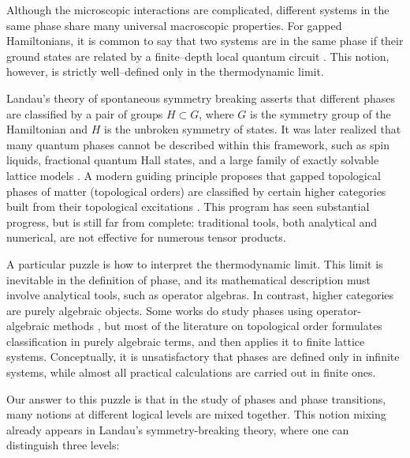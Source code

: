 \documentclass[reprint, amsmath, amssymb, showpacs, floatfix, longbibliography, aps, twocolumn, superscriptaddress, nofootinbib]{revtex4-2}
\theoremstyle{definition}
\begin{document}
Although the microscopic interactions are complicated, different systems in the same phase share many universal macroscopic properties. For gapped Hamiltonians, it is common to say that two systems are in the same phase if their ground states are related by a finite–depth local quantum circuit \cite{zeng-2019}. This notion, however, is strictly well–defined only in the thermodynamic limit.

Landau’s theory of spontaneous symmetry breaking asserts that different phases are classified by a pair of groups $H\subset G$, where $G$ is the symmetry group of the Hamiltonian and $H$ is the unbroken symmetry of states. It was later realized that many quantum phases cannot be described within this framework, such as spin liquids, fractional quantum Hall states, and a large family of exactly solvable lattice models \cite{Wen_2015}. A modern guiding principle proposes that gapped topological phases of matter (topological orders) are classified by certain higher categories built from their topological excitations \cite{Kong:2014qka,kong2024highercondensationtheory}. This program has seen substantial progress, but is still far from complete: traditional tools, both analytical and numerical, are not effective for numerous tensor products. 

A particular puzzle is how to interpret the thermodynamic limit. This limit is inevitable in the definition of phase, and its mathematical description must involve analytical tools, such as operator algebras. In contrast, higher categories are purely algebraic objects. Some works do study phases using operator-algebraic methods \cite{Kapustin_2022,NAAIJKENS_2011}, but most of the literature on topological order formulates classification in purely algebraic terms, and then applies it to finite lattice systems. Conceptually, it is unsatisfactory that phases are defined only in infinite systems, while almost all practical calculations are carried out in finite ones.


Our answer to this puzzle is that in the study of phases and phase transitions, many notions at different logical levels are mixed together. This notion mixing already appears in Landau’s symmetry-breaking theory, where one can distinguish three levels:
\end{document}
